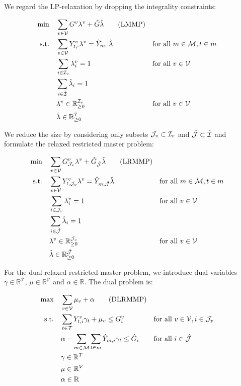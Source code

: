 We regard the LP-relaxation by dropping the integrality constraints:

\begin{align*}
	\min \quad & \sum_{v\in\mathcal{V}}G^v\lambda^v + \hat{G}\hat{\lambda} \tag{LMMP} \label{eq:LMMP} \\
	\text{s.t.} \quad & \sum_{v\in\mathcal{V}} Y^v_{t,\cdot}\lambda^v = \hat{Y}_{m,\cdot}\hat{\lambda} && \text{for all } m\in\mathcal{M},t\in m \\
	& \sum_{i\in\mathcal{I}_v}\lambda_i^v=1 && \text{for all } v\in\mathcal{V}\\
	& \sum_{i\in\hat{\mathcal{I}}}\hat{\lambda}_i= 1 \\
	& \lambda^v\in\mathbb{R}_{\geq 0}^{\mathcal{I}_v} && \text{for all } v\in\mathcal{V} \\
	& \hat{\lambda}\in\mathbb{R}_{\geq 0}^{\hat{\mathcal{I}}}
\end{align*}

We reduce the size by considering only subsets $\mathcal{J}_v\subset\mathcal{I}_v$ and $\hat{\mathcal{J}}\subset\hat{\mathcal{I}}$ and formulate the relaxed restricted master problem:

\begin{align*}
	\min \quad & \sum_{v\in\mathcal{V}}G^v_{\mathcal{J}_v}\lambda^v + \hat{G}_{\hat{\mathcal{J}}}\hat{\lambda} \tag{LRMMP} \\
	\text{s.t.} \quad & \sum_{v\in\mathcal{V}} Y^v_{t,\mathcal{J}_v}\lambda^v = \hat{Y}_{m,\hat{\mathcal{J}}}\hat{\lambda} && \text{for all } m\in\mathcal{M},t\in m \\
	& \sum_{i\in\mathcal{J}_v}\lambda_i^v=1 && \text{for all } v\in\mathcal{V}\\
	& \sum_{i\in\hat{\mathcal{J}}}\hat{\lambda}_i= 1 \\
	& \lambda^v\in\mathbb{R}_{\geq 0}^{\mathcal{J}_v} && \text{for all } v\in\mathcal{V} \\
	& \hat{\lambda}\in\mathbb{R}_{\geq 0}^{\hat{\mathcal{J}}}
\end{align*}

For the dual relaxed restricted master problem, we introduce dual variables $\gamma\in\mathbb{R}^{\mathcal{T}}$, $\mu\in\mathbb{R}^{\mathcal{V}}$ and $\alpha\in\mathbb{R}$. The dual problem is:

\begin{align*}
	\max \quad & \sum_{v\in\mathcal{V}}\mu_v + \alpha \tag{DLRMMP} \label{eq:DLRMMP} \\
	\text{s.t.} \quad & \sum_{t\in\mathcal{T}} Y^v_{t,i}\gamma_t + \mu_v \leq G^v_i && \text{for all } v\in\mathcal{V},i\in\mathcal{J}_v \\
	& \alpha - \sum_{m\in\mathcal{M}}\sum_{t\in m}\hat{Y}_{m,i}\gamma_t \leq \hat{G}_i && \text{for all } i\in\hat{\mathcal{J}} \\
	& \gamma\in\mathbb{R}^{\mathcal{T}} \\
	& \mu\in\mathbb{R}^{\mathcal{V}} \\
	& \alpha\in\mathbb{R}
\end{align*}

